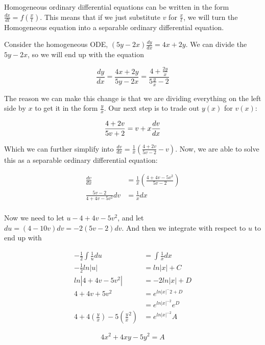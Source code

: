     Homogeneous ordinary differential equations can be written in the form $\frac{dx}{dt}=f\left(\frac{x}{t}\right)$. This means that if we just substitute $v$ for $\frac{x}{t}$, we will turn the Homogeneous equation into a separable ordinary differential equation.

    \begin{problem}
      Consider the homogeneous ODE, $(5y-2x)\frac{dy}{dx}=4x+2y$. We can divide the $5y-2x$, so we will end up with the equation

      \[
        \frac{dy}{dx}=\frac{4x+2y}{5y-2x}=\frac{4+\frac{2y}{x}}{5\frac{y}{x}-2}
      \]

      The reason we can make this change is that we are dividing everything on the left side by $x$ to get it in the form $\frac{y}{x}$. Our next step is to trade out $y(x)$ for $v(x)$:

      \[
        \frac{4+2v}{5v+2}=v+x\frac{dv}{dx}\\
      \]

      Which we can further simplify into $\frac{dv}{dx}=\frac{1}{x}\left(\frac{4+2v}{5v-2}-v\right)$. Now, we are able to solve this as a separable ordinary differential equation:

      \[
        \begin{aligned}
          \frac{dv}{dx}&=\frac{1}{x}\left(\frac{4+4v-5v^2}{5v-2}\right)\\
          \frac{5v-2}{4+4v-5v^2}dv&=\frac{1}{x}dx\\
        \end{aligned}
      \]

      Now we need to let $u-4+4v-5v^2$, and let $du=(4-10v)dv=-2(5v-2)dv$. And then we integrate with respect to $u$ to end up with 

      \[
        \begin{aligned}
          -\frac{1}{2}\int\frac{1}{u}du&=\int\frac{1}{x}dx\\
          -\frac{1}{2}ln|u|&=ln|x|+C\\
          ln|4+4v-5v^2|&=-2ln|x|+D\\
          4+4v+5v^2&=e^{ln|x|^-2+D}\\
          &=e^{ln|x|^{-2}}e^D\\
          4+4\left(\frac{y}{x}\right)-5\left(\frac{y}{x}^2\right)&=e^{ln|x|^{-2}}A
        \end{aligned}
      \]

      \[
        \boxed{4x^2+4xy-5y^2=A}
      \]
    \end{problem}

